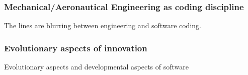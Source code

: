 \documentclass{beamer}
\begin{document}

\begin{frame}
\frametitle{Mechanical/Aeronautical Engineering as coding discipline}

The lines are blurring between engineering and software coding.


\end{frame}

\begin{frame}
\frametitle{Evolutionary aspects of innovation}

Evolutionary aspects and developmental aspects of software
\end{frame}
\end{document}
